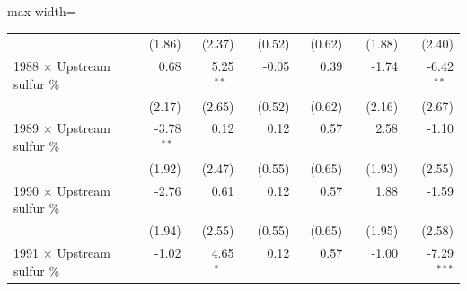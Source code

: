 \begin{table}[htbp]
{\begin{adjustbox}{max width=\linewidth}
\begin{tabular}{lrrrrrr}
 & (\phantom{-}1.86)\phantom{$^{***}$} & (\phantom{-}2.37)\phantom{$^{***}$} & (\phantom{-}0.52)\phantom{$^{***}$} & (\phantom{-}0.62)\phantom{$^{***}$} & (\phantom{-}1.88)\phantom{$^{***}$} & (\phantom{-}2.40)\phantom{$^{***}$} \\
1988 $\times$ Upstream sulfur \% & \phantom{(}\phantom{-}0.68$^{\phantom{*}\phantom{*}\phantom{*}}$ & \phantom{(}\phantom{-}5.25$^{**\phantom{*}}$ & \phantom{(}-0.05$^{\phantom{*}\phantom{*}\phantom{*}}$ & \phantom{(}\phantom{-}0.39$^{\phantom{*}\phantom{*}\phantom{*}}$ & \phantom{(}-1.74$^{\phantom{*}\phantom{*}\phantom{*}}$ & \phantom{(}-6.42$^{**\phantom{*}}$ \\
 & (\phantom{-}2.17)\phantom{$^{***}$} & (\phantom{-}2.65)\phantom{$^{***}$} & (\phantom{-}0.52)\phantom{$^{***}$} & (\phantom{-}0.62)\phantom{$^{***}$} & (\phantom{-}2.16)\phantom{$^{***}$} & (\phantom{-}2.67)\phantom{$^{***}$} \\
1989 $\times$ Upstream sulfur \% & \phantom{(}-3.78$^{**\phantom{*}}$ & \phantom{(}\phantom{-}0.12$^{\phantom{*}\phantom{*}\phantom{*}}$ & \phantom{(}\phantom{-}0.12$^{\phantom{*}\phantom{*}\phantom{*}}$ & \phantom{(}\phantom{-}0.57$^{\phantom{*}\phantom{*}\phantom{*}}$ & \phantom{(}\phantom{-}2.58$^{\phantom{*}\phantom{*}\phantom{*}}$ & \phantom{(}-1.10$^{\phantom{*}\phantom{*}\phantom{*}}$ \\
 & (\phantom{-}1.92)\phantom{$^{***}$} & (\phantom{-}2.47)\phantom{$^{***}$} & (\phantom{-}0.55)\phantom{$^{***}$} & (\phantom{-}0.65)\phantom{$^{***}$} & (\phantom{-}1.93)\phantom{$^{***}$} & (\phantom{-}2.55)\phantom{$^{***}$} \\
1990 $\times$ Upstream sulfur \% & \phantom{(}-2.76$^{\phantom{*}\phantom{*}\phantom{*}}$ & \phantom{(}\phantom{-}0.61$^{\phantom{*}\phantom{*}\phantom{*}}$ & \phantom{(}\phantom{-}0.12$^{\phantom{*}\phantom{*}\phantom{*}}$ & \phantom{(}\phantom{-}0.57$^{\phantom{*}\phantom{*}\phantom{*}}$ & \phantom{(}\phantom{-}1.88$^{\phantom{*}\phantom{*}\phantom{*}}$ & \phantom{(}-1.59$^{\phantom{*}\phantom{*}\phantom{*}}$ \\
 & (\phantom{-}1.94)\phantom{$^{***}$} & (\phantom{-}2.55)\phantom{$^{***}$} & (\phantom{-}0.55)\phantom{$^{***}$} & (\phantom{-}0.65)\phantom{$^{***}$} & (\phantom{-}1.95)\phantom{$^{***}$} & (\phantom{-}2.58)\phantom{$^{***}$} \\
1991 $\times$ Upstream sulfur \% & \phantom{(}-1.02$^{\phantom{*}\phantom{*}\phantom{*}}$ & \phantom{(}\phantom{-}4.65$^{*\phantom{*}\phantom{*}}$ & \phantom{(}\phantom{-}0.12$^{\phantom{*}\phantom{*}\phantom{*}}$ & \phantom{(}\phantom{-}0.57$^{\phantom{*}\phantom{*}\phantom{*}}$ & \phantom{(}-1.00$^{\phantom{*}\phantom{*}\phantom{*}}$ & \phantom{(}-7.29$^{***}$ \\

\end{tabular}
\end{adjustbox}}
\end{table}
